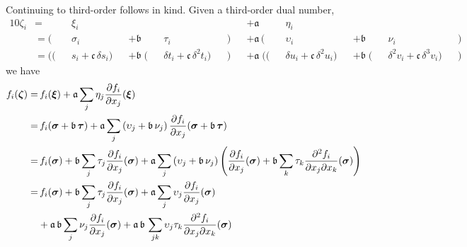 Continuing to third-order follows in kind.  Given a third-order dual number,
%
\begin{alignat*}{10}
\zeta_{i} 
&=
&& \xi_{i} && && &&
&&+ \mathfrak{a} \, 
&& \eta_{i} && && &&
\\
&=
( && \sigma_{i} && + \mathfrak{b} && \tau_{i} &&)
&&+ \mathfrak{a} \,
( && \upsilon_{i} && + \mathfrak{b} && \nu_{i} && )
\\
&=
(( && s_{i} + \mathfrak{c} \, \delta s_{i} )
&& + \mathfrak{b} \;
( && \delta t_{i} + \mathfrak{c} \, \delta^{2} t_{i}  ) &&)
&&+ \mathfrak{a} \;
(( && \delta u_{i} + \mathfrak{c} \, \delta^{2} u_{i} )
&& + \mathfrak{b} \;
( && \delta^{2} v_{i} + \mathfrak{c} \, \delta^{3} v_{i} ) &&)
\end{alignat*}
%
we have
%
\begin{align*}
f_{i} \! \left( \mbox{\boldmath{$\zeta$}} \right)
%
=& \,
f_{i} \! \left( \mbox{\boldmath{$\xi$}}\right) 
+ \mathfrak{a} \sum_{j} \eta_{j} \frac{ \partial f_{i} }{ \partial x_{j} } \! \left( \mbox{\boldmath{$\xi$}} \right) 
\\
%
=& \,
f_{i} \! \left( \mbox{\boldmath{$\sigma$}} + \mathfrak{b} \, \mbox{\boldmath{$\tau$}} \right) 
+ \mathfrak{a} \sum_{j} \left( \upsilon_{j} + \mathfrak{b} \, \nu_{j} \right)
\frac{ \partial f_{i} }{ \partial x_{j} } 
\! \left( \mbox{\boldmath{$\sigma$}} + \mathfrak{b} \, \mbox{\boldmath{$\tau$}} \right) 
\\
%
=& \,
f_{i} \! \left( \mbox{\boldmath{$\sigma$}} \right) + \mathfrak{b} 
\sum_{j} \tau_{j} \frac{ \partial f_{i} }{ \partial x_{j} } 
\! \left( \mbox{\boldmath{$\sigma$}} \right)
+ \mathfrak{a} \sum_{j} \left( \upsilon_{j} + \mathfrak{b} \, \nu_{j} \right)
\left( \frac{ \partial f_{i} }{ \partial x_{j} } \! \left( \mbox{\boldmath{$\sigma$}} \right)
+ \mathfrak{b} \sum_{k} \tau_{k}
\frac{ \partial^{2} f_{i} }{ \partial x_{j} \partial x_{k} } \! \left( \mbox{\boldmath{$\sigma$}} \right) \right) 
\\
%
=& \,
f_{i} \! \left( \mbox{\boldmath{$\sigma$}} \right) + \mathfrak{b} 
\sum_{j} \tau_{j} \frac{ \partial f_{i} }{ \partial x_{j} } 
\! \left( \mbox{\boldmath{$\sigma$}} \right)
+ \mathfrak{a} \sum_{j}
\upsilon_{j} \frac{ \partial f_{i} }{ \partial x_{j} } \! \left( \mbox{\boldmath{$\sigma$}} \right)
\\
& + \mathfrak{a} \, \mathfrak{b} \sum_{j}
 \nu_{j} \frac{ \partial f_{i} }{ \partial x_{j} } \! \left( \mbox{\boldmath{$\sigma$}} \right)
+ \mathfrak{a} \, \mathfrak{b} \, \sum_{jk} \upsilon_{j} \tau_{k}
\frac{ \partial^{2} f_{i} }{ \partial x_{j} \partial x_{k} } \! \left( \mbox{\boldmath{$\sigma$}} \right)

\end{align*}
